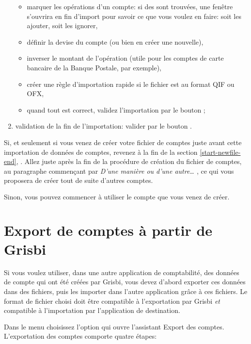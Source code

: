 \begin{enumerate}
\begin{itemize}
			\item marquer les opérations d'un compte: si des  sont trouvées, une fenêtre s'ouvrira en fin d'import pour savoir ce que vous voulez en faire: soit les ajouter, soit les ignorer,
			\item définir la devise du compte (ou bien en créer une nouvelle),
			\item   inverser le montant de l'opération (utile pour les comptes de carte bancaire de la Banque Postale, par exemple),
			\item créer une règle d'importation rapide si le fichier est au format QIF ou OFX,
			\item quand tout est correct, validez l'importation par le bouton ;
		\end{itemize}
\newpage
	\item validation de la fin de l'importation: valider par le bouton .
\end{enumerate}

Si, et seulement si vous venez de créer votre fichier de comptes juste avant cette importation de données de comptes, revenez à la fin de la section \vref{start-newfile-end}, . Allez juste après la fin de la procédure de création du fichier de comptes, au paragraphe commençant par \emph{D'une manière ou d'une autre\ldots{ }}, ce qui vous proposera de créer tout de suite d'autres comptes.

Sinon, vous pouvez commencer à utiliser le compte que vous venez de créer.


\section{Export de comptes à partir de Grisbi\label{move-export}}


Si vous voulez utiliser, dans une autre application de comptabilité, des données de compte qui ont été créées par Grisbi, vous devez d'abord exporter ces données dans des fichiers, puis les importer dans l'autre application grâce à ces fichiers. Le format de fichier choisi doit être compatible à l'exportation par Grisbi \emph{et} compatible à l'importation par l'application de destination.
 
Dans le menu  choisissez l'option  qui ouvre l'assistant Export des comptes. L'exportation des comptes comporte quatre étapes:

